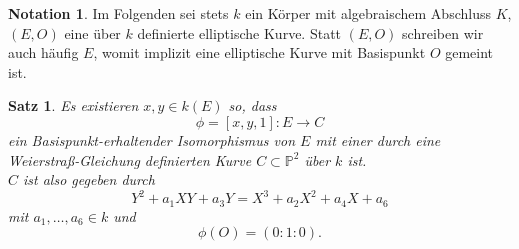 \documentclass{amsart}
\theoremstyle{plain}
\newtheorem{proposition}[subsection]{Satz}
\theoremstyle{definition}
\newtheorem*{notation}{Notation}
\newcommand{\projspace}{\mathds{P}}
\begin{document}
\begin{notation}
	Im Folgenden sei stets $k$ ein Körper mit algebraischem Abschluss $K$, $(E, O)$ eine über $k$ definierte elliptische Kurve. 
	Statt $(E, O)$ schreiben wir auch häufig $E$, womit implizit eine elliptische Kurve mit Basispunkt $O$ gemeint ist.
\end{notation}

\begin{proposition}
	\label{prop-existenz-weierstrass-koordinaten}
	Es existieren $x, y \in k(E)$ so, dass
	\begin{equation*}
		\phi = [x, y, 1] : E \rightarrow C
	\end{equation*}
	ein Basispunkt-erhaltender Isomorphismus von $E$ mit einer durch eine Weierstraß-Gleichung definierten Kurve $C \subset \projspace^2$ über $k$ ist. \\
	$C$ ist also gegeben durch
	\begin{equation*}
		Y^2 + a_1 XY + a_3 Y = X^3 + a_2 X^2 + a_4 X + a_6
	\end{equation*}
	mit $a_1, \dots, a_6 \in k$ und
	\begin{equation*}
		\phi(O) = (0 : 1 : 0).
	\end{equation*}
\end{proposition}
\end{document}
